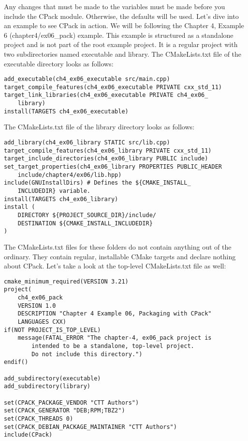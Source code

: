 Any changes that must be made to the variables must be made before you include the CPack module. Otherwise, the defaults will be used. Let's dive into an example to see CPack in action. We will be following the Chapter 4, Example 6 (chapter4/ex06\_pack) example. This example is structured as a standalone project and is not part of the root example project. It is a regular project with two subdirectories named executable and library. The CMakeLists.txt file of the executable directory looks as follows:

\begin{lstlisting}[style=styleCMake]
add_executable(ch4_ex06_executable src/main.cpp)
target_compile_features(ch4_ex06_executable PRIVATE cxx_std_11)
target_link_libraries(ch4_ex06_executable PRIVATE ch4_ex06_
	library)
install(TARGETS ch4_ex06_executable)
\end{lstlisting}

The CMakeLists.txt file of the library directory looks as follows:

\begin{lstlisting}[style=styleCMake]
add_library(ch4_ex06_library STATIC src/lib.cpp)
target_compile_features(ch4_ex06_library PRIVATE cxx_std_11)
target_include_directories(ch4_ex06_library PUBLIC include)
set_target_properties(ch4_ex06_library PROPERTIES PUBLIC_HEADER
	include/chapter4/ex06/lib.hpp)
include(GNUInstallDirs) # Defines the ${CMAKE_INSTALL_
	INCLUDEDIR} variable.
install(TARGETS ch4_ex06_library)
install (
	DIRECTORY ${PROJECT_SOURCE_DIR}/include/
	DESTINATION ${CMAKE_INSTALL_INCLUDEDIR}
)
\end{lstlisting}

The CMakeLists.txt files for these folders do not contain anything out of the ordinary. They contain regular, installable CMake targets and declare nothing about CPack. Let's take a look at the top-level CMakeLists.txt file as well:

\begin{lstlisting}[style=styleCMake]
cmake_minimum_required(VERSION 3.21)
project(
	ch4_ex06_pack
	VERSION 1.0
	DESCRIPTION "Chapter 4 Example 06, Packaging with CPack"
	LANGUAGES CXX)
if(NOT PROJECT_IS_TOP_LEVEL)
	message(FATAL_ERROR "The chapter-4, ex06_pack project is
		intended to be a standalone, top-level project.
		Do not include this directory.")
endif()

add_subdirectory(executable)
add_subdirectory(library)

set(CPACK_PACKAGE_VENDOR "CTT Authors")
set(CPACK_GENERATOR "DEB;RPM;TBZ2")
set(CPACK_THREADS 0)
set(CPACK_DEBIAN_PACKAGE_MAINTAINER "CTT Authors")
include(CPack)
\end{lstlisting}

